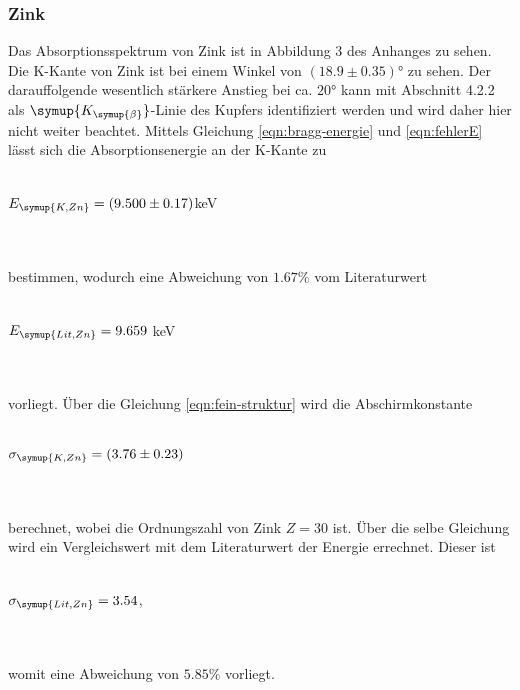         \subsubsection{Zink}
            Das Absorptionsspektrum von Zink ist in Abbildung 3 des Anhanges zu sehen.
            Die K-Kante von Zink ist bei einem Winkel von $(18.9 \pm 0.35)°$ zu sehen. Der darauffolgende
            wesentlich stärkere Anstieg bei ca. $20°$ kann mit Abschnitt 4.2.2 als 
            $\symup{K_{\symup{\beta}}}$-Linie des Kupfers identifiziert werden und wird
            daher hier nicht weiter beachtet. Mittels Gleichung \eqref{eqn:bragg-energie} und \eqref{eqn:fehlerE} lässt sich
            die Absorptionsenergie an der K-Kante zu 
            \\ \\
            \centerline{$E_{\symup{K, Zn}} = (9.500 \pm 0.17)$keV}
            \\ \\
            bestimmen, wodurch eine Abweichung von $1.67 \%$ vom Literaturwert
            \\ \\
            \centerline{$E_{\symup{Lit, Zn}} = 9.659$ keV \cite{periodic}}
            \\ \\
            vorliegt. Über die Gleichung \eqref{eqn:fein-struktur} wird die Abschirmkonstante 
            \\ \\
            \centerline{$\sigma_{\symup{K, Zn}} = (3.76 \pm 0.23)$}
            \\ \\
            berechnet, wobei die Ordnungszahl von Zink $Z = 30$ ist.
            Über die selbe Gleichung wird ein Vergleichswert mit dem Literaturwert der Energie 
            errechnet. Dieser ist
            \\ \\
            \centerline{$\sigma_{\symup{Lit, Zn}} = 3.54$,}
            \\ \\
            womit eine Abweichung von $5.85 \%$ vorliegt.
